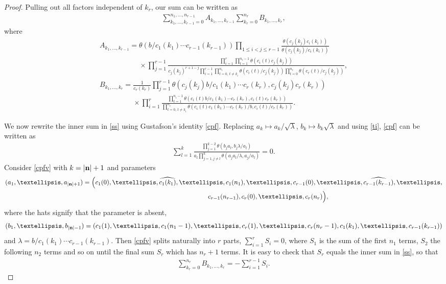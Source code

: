 \documentclass[11pt]{article}
\numberwithin{equation}{section}
\begin{document}
\begin{proof}
 Pulling out all factors independent of $k_r$, our
sum can be written as
\begin{gather}\label{ss}
\sum_{k_1,\dots,k_{r-1}=0}^{n_1,\dots,n_{r-1}}A_{k_1,\dots,k_{r-1}}
\sum_{k_r=0}^{n_r}B_{k_1,\dots,k_{r}},
\end{gather}
where
\begin{gather*}
A_{k_1,\dots,k_{r-1}}
=\theta(b/c_1(k_1)\dotsm c_{r-1}(k_{r-1}))\prod\limits_{1\leq i<j\leq
 r-1}\frac{\theta(c_j(k_j)c_i(k_i))}{\theta(c_j(k_j)/c_i(k_i))}
 \\ \phantom{A_{k_1,\dots,k_{r-1}}=}{}
\times\prod\limits_{j=1}^{r-1}\frac{\prod\limits_{i=1}^r\prod\limits_{t=1}^{n_i-1}
\theta(c_i(t)c_j(k_j))}
{c_j(k_j)^{r+1-j}\prod\limits_{i=1}^{r-1}\prod\limits_{t=0,\,t\neq
 k_i}^{n_i}\theta(c_i(t)/c_j(k_j))\prod\limits_{t=0}^{n_r}\theta(c_r(t)/c_j(k_j))},
\\
B_{k_1,\dots,k_{r}}=
\frac{1}{c_r(k_r)}\prod\limits_{j=1}^{r-1}
\theta(c_j(k_j)b/c_1(k_1)\dotsm c_r(k_r),c_j(k_j)c_r(k_r))
\\ \phantom{B_{k_1,\dots,k_{r}}=}{}
\times\prod\limits_{i=1}^r\frac{\prod\limits_{t=1}^{n_i-1}\theta(c_i(t)b/c_1(k_1)\dotsm
 c_r(k_r),c_i(t)c_r(k_r))}{\prod\limits_{t=0,\,t\neq
 k_i}^{n_i}\theta(c_i(t)c_1(k_1)\dotsm
 c_r(k_r)/b,c_i(t)/c_r(k_r))}.
 \end{gather*}

We now rewrite the inner sum in \eqref{ss} using
 Gustafson's identity \eqref{cpf}. Replacing $a_k\mapsto
a_k/\sqrt\lambda$, $b_k\mapsto b_k\sqrt\lambda$ and using \eqref{ti},
\eqref{cpf} can be written as
\begin{gather}\label{cpfv}
\sum_{l=1}^k\frac{\prod\limits_{j=1}^{k-2}\theta(b_ja_l,b_j\lambda/a_l)}
{a_l\prod\limits_{j=1, j\neq l}^k\theta(a_ja_l/\lambda,a_j/a_l)}=0.
\end{gather}
Consider \eqref{cpfv} with $k=|{\bf n}|+1$ and parameters
\begin{gather*}
(a_1,\dots,a_{|{\bf n}|+1})=
\Big(c_1(0),\dots,\widehat{c_1(k_1)},\dots,c_1(n_1),\dots, c_{r-1}(0),\dots,\widehat{c_{r-1}(k_{r-1})},
\dots,
\\ \phantom{(a_1,\dots,a_{|{\bf n}|+1})=(}
c_{r-1}(n_{r-1}), c_r(0),\dots,c_r(n_r)\Big),
\end{gather*}
where the hats signify that the parameter is absent,
\begin{gather*}
(b_1,\dots,b_{|{\bf n}|-1})=
(c_1(1),\dots,c_1(n_1-1),\dots, c_r(1),\dots,c_r(n_r-1),
c_1(k_1),\dots,c_{r-1}(k_{r-1}))
\end{gather*}
and $\lambda=b/c_1(k_1)\dotsm c_{r-1}(k_{r-1})$. Then \eqref{cpfv}
splits naturally into $r$ parts, $\sum_{i=1}^rS_i=0$, where $S_1$ is
the sum of the first $n_1$ terms, $S_2$ the following $n_2$ terms and
so on until the final sum $S_r$ which has $n_r+1$ terms. It is
easy to check that $S_r$ equals the inner sum in \eqref{ss}, so that
\begin{gather*}
\sum_{k_r=0}^{n_r}B_{k_1,\dots,k_{r}}=-\sum_{i=1}^{r-1}S_i.
\end{gather*}


\end{proof}
\end{document}
